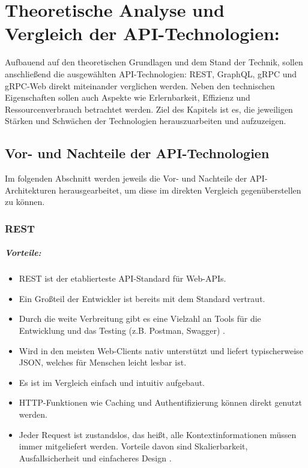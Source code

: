 \chapter{Theoretische Analyse und Vergleich der API-Technologien:}
\label{chap:intro}
\chapterstart
Aufbauend auf den theoretischen Grundlagen und dem Stand der Technik, sollen anschließend die ausgewählten API-Technologien: REST, GraphQL, gRPC und gRPC-Web direkt miteinander verglichen werden. Neben den technischen Eigenschaften sollen auch Aspekte wie Erlernbarkeit, Effizienz und Ressourcenverbrauch betrachtet werden. Ziel des Kapitels ist es, die jeweiligen Stärken und Schwächen der Technologien herauszuarbeiten und aufzuzeigen.

\section{Vor- und Nachteile der API-Technologien}
Im folgenden Abschnitt werden jeweils die Vor- und Nachteile der API-Architekturen herausgearbeitet, um diese im direkten Vergleich gegenüberstellen zu können. 
\subsection{REST}

\paragraph{Vorteile:}
\begin{itemize}
	\item REST ist der etablierteste API-Standard für Web-APIs.
	\item Ein Großteil der Entwickler ist bereits mit dem Standard vertraut.
	\item Durch die weite Verbreitung gibt es eine Vielzahl an Tools für die Entwicklung und das Testing (z.B. Postman, Swagger) \parencite{postman2022, postman2023}.
	\item Wird in den meisten Web-Clients nativ unterstützt und liefert typischerweise JSON, welches für Menschen leicht lesbar ist.
	\item Es ist im Vergleich einfach und intuitiv aufgebaut.
	\item HTTP-Funktionen wie Caching und Authentifizierung können direkt genutzt werden.
	\item Jeder Request ist zustandslos, das heißt, alle Kontextinformationen müssen immer mitgeliefert werden. Vorteile davon sind Skalierbarkeit, Ausfallsicherheit und einfacheres Design \parencite{fielding2000rest}. 
\end{itemize}

